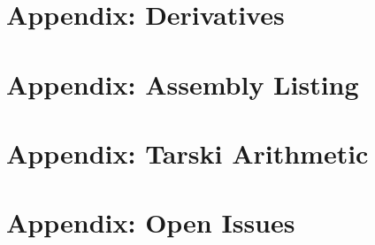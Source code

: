\documentclass[cup9a]{cupbook}
\begin{document}

    
    \label{part:appendix}
    \chapter{Appendix: Derivatives}
    \chapter{Appendix: Assembly Listing}
    
    \chapter{Appendix: Tarski Arithmetic}
     
    \chapter{Appendix: Open Issues} %
    






\backmatter

\theendnotes


\end{document}
